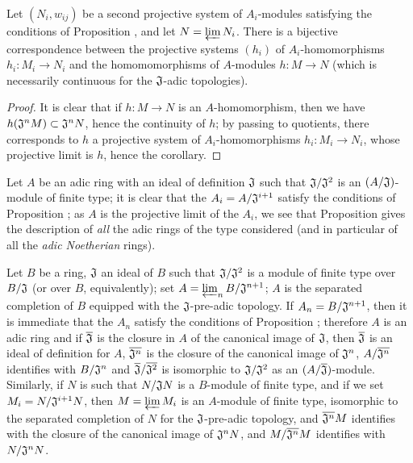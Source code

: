 \begin{cor}[7.2.10]
\label{0.7.2.10}
Let $(N_i,w_{ij})$ be a second projective system of $A_i$-modules satisfying the conditions
of Proposition , and let $N=\varprojlim N_i$. There is a
bijective correspondence between the projective systems $(h_i)$ of $A_i$-homomorphisms
$h_i:M_i\to N_i$ and the homomomorphisms of $A$-modules $h:M\to N$ (which is necessarily
continuous for the $\mathfrak{J}$-adic topologies).
\end{cor}

\begin{proof}
\label{proof-0.7.2.10}
It is clear that if $h:M\to N$ is an $A$-homomorphism, then we have
$h(\mathfrak{J}^n M)\subset\mathfrak{J}^n N$, hence the continuity of $h$; by passing to
quotients, there corresponds to $h$ a projective system of $A_i$-homomorphisms
$h_i:M_i\to N_i$, whose projective limit is $h$, hence the corollary.
\end{proof}

\begin{rmk}[7.2.11]
\label{0.7.2.11}
Let $A$ be an adic ring with an ideal of definition $\mathfrak{J}$ such that
$\mathfrak{J}/\mathfrak{J}^2$ is an $(A/\mathfrak{J})$-module of finite type; it is clear
that the $A_i=A/\mathfrak{J}^{i+1}$ satisfy
the conditions of Proposition ; as $A$ is the projective
limit of the $A_i$, we see that Proposition  gives the
description of {\em all} the adic rings of the type considered (and in particular of all
the {\em adic Noetherian} rings).
\end{rmk}

\begin{exm}[7.2.12]
\label{0.7.2.12}
Let $B$ be a ring, $\mathfrak{J}$ an ideal of $B$ such that $\mathfrak{J}/\mathfrak{J}^2$ is
a module of finite type over $B/\mathfrak{J}$ (or over $B$, equivalently); set
$A=\varprojlim_n B/\mathfrak{J}^{n+1}$; $A$ is the separated completion of $B$ equipped with
the $\mathfrak{J}$-pre-adic topology. If $A_n=B/\mathfrak{J}^{n+1}$, then it is immediate
that the $A_n$ satisfy the conditions of Proposition ;
therefore $A$ is an adic ring and if $\overline{\mathfrak{J}}$ is the closure in $A$ of the
canonical image of $\mathfrak{J}$, then $\overline{\mathfrak{J}}$ is an ideal of definition
for $A$, $\overline{\mathfrak{J}^n}$ is the closure of the canonical image of
$\mathfrak{J}^n$, $A/\overline{\mathfrak{J}^n}$ identifies with $B/\mathfrak{J}^n$ and
$\overline{\mathfrak{J}}/\overline{\mathfrak{J}^2}$ is isomorphic to
$\mathfrak{J}/\mathfrak{J}^2$ as an $(A/\overline{\mathfrak{J}})$-module. Similarly, if $N$
is such that $N/\mathfrak{J}N$ is a $B$-module of finite type, and if we set
$M_i=N/\mathfrak{J}^{i+1}N$, then $M=\varprojlim M_i$ is an $A$-module of finite type,
isomorphic to the separated completion of $N$ for the $\mathfrak{J}$-pre-adic topology, and
$\overline{\mathfrak{J}^n}M$ identifies with the closure of the canonical image of
$\mathfrak{J}^n N$, and $M/\overline{\mathfrak{J}^n}M$ identifies with
$N/\mathfrak{J}^n N$.
\end{exm}

